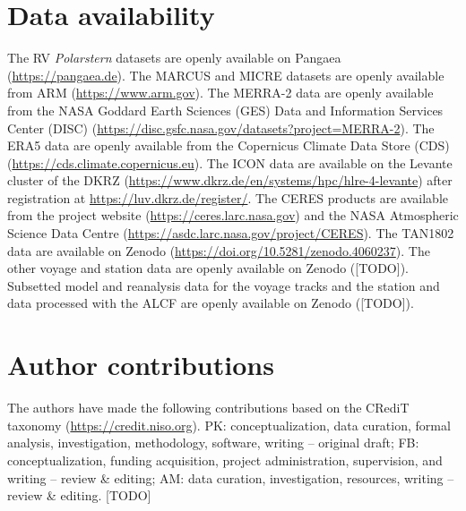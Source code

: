 \documentclass[12pt,a4paper]{article}
\begin{document}
\section*{Data availability}

The RV \emph{Polarstern} datasets are openly available on Pangaea
(\url{https://pangaea.de}). The MARCUS and MICRE datasets are openly available
from ARM (\url{https://www.arm.gov}). The MERRA-2 data are openly available
from the NASA Goddard Earth Sciences (GES) Data and Information Services Center
(DISC) (\url{https://disc.gsfc.nasa.gov/datasets?project=MERRA-2}).  The ERA5
data are openly available from the Copernicus Climate Data Store (CDS)
(\url{https://cds.climate.copernicus.eu}). The ICON data are available on the
Levante cluster of the DKRZ
(\url{https://www.dkrz.de/en/systems/hpc/hlre-4-levante}) after registration at
\url{https://luv.dkrz.de/register/}. The CERES products are available from the
project website (\url{https://ceres.larc.nasa.gov}) and the NASA Atmospheric
Science Data Centre (\url{https://asdc.larc.nasa.gov/project/CERES}).  The
TAN1802 data are available on Zenodo
(\url{https://doi.org/10.5281/zenodo.4060237}).  The other voyage and station
data are openly available on Zenodo ([TODO]). Subsetted model and reanalysis data
for the voyage tracks and the station and data processed with the ALCF are
openly available on Zenodo ([TODO]).

\section*{Author contributions}

The authors have made the following contributions based on the CRediT taxonomy
(\url{https://credit.niso.org}).  PK: conceptualization, data curation, formal
analysis, investigation, methodology, software, writing – original draft; FB:
conceptualization, funding acquisition, project administration, supervision,
and writing – review \& editing; AM: data curation, investigation, resources,
writing – review \& editing. [TODO]

\fontsize{11pt}{13pt}\selectfont
\setlength{\bibsep}{0.0pt}

\end{document}
